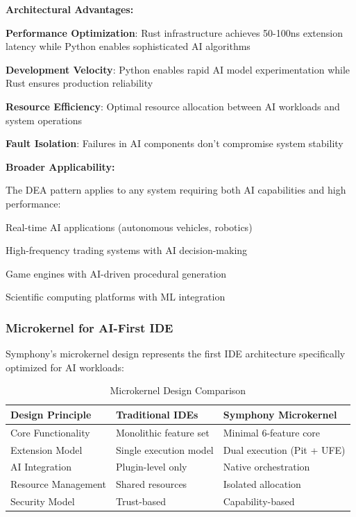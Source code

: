 \textbf{Architectural Advantages:}

\begin{expandedlist}
    \item \textbf{Performance Optimization}: Rust infrastructure achieves 50-100ns extension latency while Python enables sophisticated AI algorithms
    
    \item \textbf{Development Velocity}: Python enables rapid AI model experimentation while Rust ensures production reliability
    
    \item \textbf{Resource Efficiency}: Optimal resource allocation between AI workloads and system operations
    
    \item \textbf{Fault Isolation}: Failures in AI components don't compromise system stability
\end{expandedlist}

\textbf{Broader Applicability:}

The DEA pattern applies to any system requiring both AI capabilities and high performance:
\begin{compactlist}
    \item Real-time AI applications (autonomous vehicles, robotics)
    \item High-frequency trading systems with AI decision-making
    \item Game engines with AI-driven procedural generation
    \item Scientific computing platforms with ML integration
\end{compactlist}

\subsubsection{Microkernel for AI-First IDE}

Symphony's microkernel design represents the first IDE architecture specifically optimized for AI workloads:

\begin{table}[ht]
\centering
\begin{tabular}{@{}lll@{}}
\toprule
\textbf{Design Principle} & \textbf{Traditional IDEs} & \textbf{Symphony Microkernel} \\
\midrule
Core Functionality & Monolithic feature set & Minimal 6-feature core \\
Extension Model & Single execution model & Dual execution (Pit + UFE) \\
AI Integration & Plugin-level only & Native orchestration \\
Resource Management & Shared resources & Isolated allocation \\
Security Model & Trust-based & Capability-based \\
\bottomrule
\end{tabular}
\caption{Microkernel Design Comparison}
\label{tab:microkernel-comparison}
\end{table}

